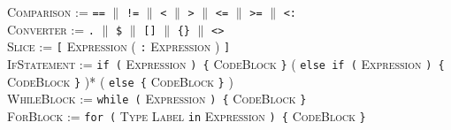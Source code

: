 \documentclass{article}
\newcommand{\code}[1]{\colorbox{light-gray}{\texttt{#1}}}
\begin{document}
\textsc{Comparison} := \code{==} $\|$ \code{!=} $\|$ \code{<} $\|$ \code{>} $\|$ \code{<=} $\|$ \code{>=} $\|$ \code{<:} \\

\textsc{Converter} := \code{.} $\|$ \code{\$} $\|$ \code{[]} $\|$ \code{\{\}} $\|$ \code{<>} \\

\textsc{Slice} := \code{[} \textsc{Expression} ( \code{:} \textsc{Expression} ) \code{]} \\

\textsc{IfStatement} := \code{if (} \textsc{Expression} \code{) \{} \textsc{CodeBlock} \code{\}} ( \code{else if (} \textsc{Expression} \code{) \{} \textsc{CodeBlock} \code{\}} )* ( \code{else \{} \textsc{CodeBlock} \code{\}} ) \\

\textsc{WhileBlock} := \code{while (} \textsc{Expression} \code{) \{} \textsc{CodeBlock} \code{\}} \\

\textsc{ForBlock} := \code{for (} \textsc{Type} \textsc{Label} \code{in} \textsc{Expression} \code{) \{} \textsc{CodeBlock} \code{\}}
\end{document}
